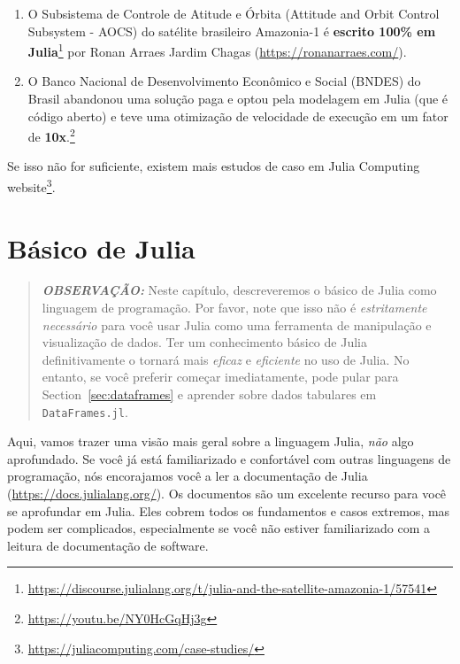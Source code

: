 \documentclass[
  notoc %
]{tufte-book}
\DeclareRobustCommand{\href}[2]{#2\footnote{\url{#1}}}
\newcommand{\passthrough}[1]{#1}
\begin{document}
\begin{enumerate}
  na 11ª American Conference of Pharmacometrics (ACoP11) e
  \href{https://web.archive.org/web/20210121164011/https://www.go-acop.org/abstract-awards}{ganhou
  um prêmio de qualidade}.
\item
  \href{https://discourse.julialang.org/t/julia-and-the-satellite-amazonia-1/57541}{O
  Subsistema de Controle de Atitude e Órbita (Attitude and Orbit Control
  Subsystem - AOCS) do satélite brasileiro Amazonia-1 é \textbf{escrito
  100\% em Julia}} por Ronan Arraes Jardim Chagas
  (\url{https://ronanarraes.com/}).
\item
  \href{https://youtu.be/NY0HcGqHj3g}{O Banco Nacional de
  Desenvolvimento Econômico e Social (BNDES) do Brasil abandonou uma
  solução paga e optou pela modelagem em Julia (que é código aberto) e
  teve uma otimização de velocidade de execução em um fator de
  \textbf{10x}.}
\end{enumerate}

Se isso não for suficiente, existem mais estudos de caso em
\href{https://juliacomputing.com/case-studies/}{Julia Computing
website}.

\hypertarget{sec:julia_basics}{%
\chapter{Básico de Julia}\label{sec:julia_basics}}

\begin{quote}
\textbf{\emph{OBSERVAÇÃO:}} Neste capítulo, descreveremos o básico de
Julia como linguagem de programação. Por favor, note que isso não é
\emph{estritamente necessário} para você usar Julia como uma ferramenta
de manipulação e visualização de dados. Ter um conhecimento básico de
Julia definitivamente o tornará mais \emph{eficaz} e \emph{eficiente} no
uso de Julia. No entanto, se você preferir começar imediatamente, pode
pular para Section~\ref{sec:dataframes} e aprender sobre dados tabulares
em \passthrough{\lstinline!DataFrames.jl!}.
\end{quote}

Aqui, vamos trazer uma visão mais geral sobre a linguagem Julia,
\emph{não} algo aprofundado. Se você já está familiarizado e confortável
com outras linguagens de programação, nós encorajamos você a ler a
documentação de Julia (\url{https://docs.julialang.org/}). Os documentos
são um excelente recurso para você se aprofundar em Julia. Eles cobrem
todos os fundamentos e casos extremos, mas podem ser complicados,
especialmente se você não estiver familiarizado com a leitura de
documentação de software.
\end{document}
